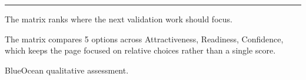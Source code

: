\documentclass[10pt,a4paper]{article}
\begin{document}
\vspace{3pt}\noindent\begin{minipage}[t]{0.58\linewidth}
\textcolor{BOGreen}{\rule{24mm}{0.6pt}}\par\vspace{3pt}
{\footnotesize\color{BOText} The matrix ranks where the next validation work should focus.}\par\vspace{2pt}
{\footnotesize\color{BOText} The matrix compares 5 options across Attractiveness, Readiness, Confidence, which keeps the page focused on relative choices rather than a single score.}\par\vspace{2pt}
\end{minipage}\hfill\begin{minipage}[t]{0.36\linewidth}
\par
\end{minipage}\par\vspace{2pt}
\par
{\scriptsize\color{BOMuted} BlueOcean qualitative assessment.}\par
\end{document}
